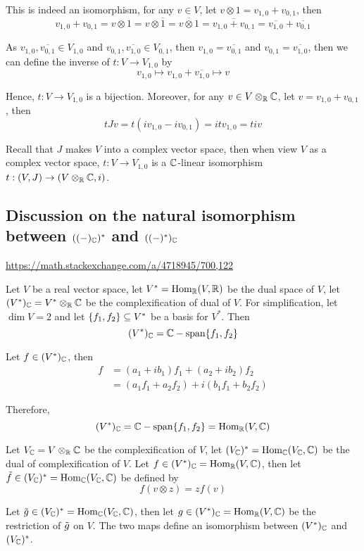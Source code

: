 \begin{remark}
	This is indeed an isomorphism, for any $v \in V$, let $v \otimes 1 = v_{1,0} + v_{0,1}$, then
	$$
		v_{1,0} + v_{0,1} = v \otimes 1 = v \otimes \overline{1} = \overline{v \otimes 1} = \overline{v_{1,0} + v_{0,1}} = \overline{v_{1,0}} + \overline{v_{0,1}}
	$$
	
	As $v_{1,0}, \overline{v_{0,1}} \in V_{1, 0}$ and $v_{0, 1}, \overline{v_{1, 0}} \in V_{0, 1}$, then $v_{1,0} = \overline{v_{0,1}}$ and $v_{0,1} = \overline{v_{1,0}}$, then we can define the inverse of $t: V \to V_{1,0}$ by
	$$
		v_{1,0} \mapsto v_{1,0} + \overline{v_{1,0}} \mapsto v
	$$
	
	Hence, $t: V \to V_{1,0}$ is a bijection. Moreover, for any $v \in V \otimes_{\mathbb{R}} \mathbb{C}$, let $v = v_{1,0} + v_{0,1}$, then
	$$
		t J v = t(i v_{1,0} - i v_{0,1}) = i t v_{1,0} = t i v
	$$
	
	Recall that $J$ makes $V$ into a complex vector space, then when view $V$ as a complex vector space, $t: V \to V_{1,0}$ is a $\mathbb{C}$-linear isomorphism $t: (V, J) \to (V \otimes_{\mathbb{R}} \mathbb{C}, i)$.
\end{remark}

\subsection{Discussion on the natural isomorphism between $((-)_{\mathbb{C}})^*$ and $((-)^*)_{\mathbb{C}}$}

\begin{remark}
	\url{https://math.stackexchange.com/a/4718945/700,122}
	
	Let $V$ be a real vector space, let $V^* = \operatorname{Hom}_{\mathbb{R}}(V, \mathbb{R})$ be the dual space of $V$, let $(V^*)_{\mathbb{C}} = V^* \otimes_{\mathbb{R}} \mathbb{C}$ be the complexification of dual of $V$. For simplification, let $\dim V = 2$ and let $\{f_1, f_2\} \subseteq V^*$ be a basis for $V^*$. Then
	$$
	(V^*)_{\mathbb{C}} = \mathbb{C}-\operatorname{span} \{f_1, f_2\}
	$$
	
	Let $f \in (V^*)_{\mathbb{C}}$, then
	\begin{align*}
		f
		&= (a_1 + ib_1) f_1 + (a_2 + ib_2) f_2 \\
		&= (a_1 f_1 + a_2 f_2) + i (b_1 f_1 + b_2 f_2)
	\end{align*}
	
	Therefore, 
	$$
	(V^*)_{\mathbb{C}} = \mathbb{C}-\operatorname{span} \{f_1, f_2\} = \operatorname{Hom}_{\mathbb{R}}(V, \mathbb{C})
	$$
	
	Let $V_{\mathbb{C}} = V \otimes_{\mathbb{R}} \mathbb{C}$ be the complexification of $V$, let $(V_{\mathbb{C}})^* = \operatorname{Hom}_{\mathbb{C}}(V_{\mathbb{C}}, \mathbb{C})$ be the dual of complexification of $V$. Let $f \in (V^*)_{\mathbb{C}} = \operatorname{Hom}_{\mathbb{R}}(V, \mathbb{C})$, then let $\Tilde{f} \in (V_{\mathbb{C}})^* = \operatorname{Hom}_{\mathbb{C}}(V_{\mathbb{C}}, \mathbb{C})$ be defined by
	$$
	f(v \otimes z) = z f(v)
	$$
	
	Let $\Tilde{g} \in (V_{\mathbb{C}})^* = \operatorname{Hom}_{\mathbb{C}}(V_{\mathbb{C}}, \mathbb{C})$, then let $g \in (V^*)_{\mathbb{C}} = \operatorname{Hom}_{\mathbb{R}}(V, \mathbb{C})$ be the restriction of $\Tilde{g}$ on $V$. The two maps define an isomorphism between $(V^*)_{\mathbb{C}}$ and $(V_{\mathbb{C}})^*$.
\end{remark}

